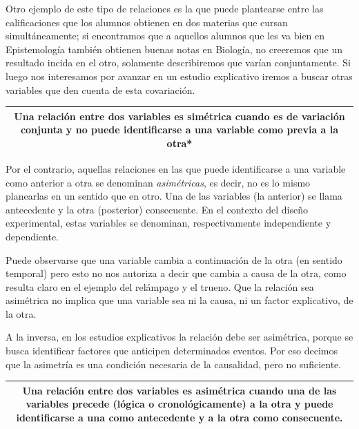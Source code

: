 \documentclass[]{book}
\begin{document}
Otro ejemplo de este tipo de relaciones es la que puede plantearse entre las calificaciones que los alumnos obtienen en dos materias que cursan simultáneamente; si encontramos que a aquellos alumnos que les va bien en Epistemología también obtienen buenas notas en Biología, no creeremos que un resultado incida en el otro, solamente describiremos que varían conjuntamente. Si luego nos interesamos por avanzar en un estudio explicativo iremos a buscar otras variables que den cuenta de esta covariación.

\begin{longtable}[]{@{}c@{}}
\toprule
\endhead
\begin{minipage}[t]{0.97\columnwidth}\centering
Una relación entre dos variables es \textbf{simétrica} cuando es de variación conjunta y no puede identificarse a una variable como previa a la otra*\strut
\end{minipage}\tabularnewline
\bottomrule
\end{longtable}

Por el contrario, aquellas relaciones en las que puede identificarse a una variable como anterior a otra se denominan \emph{asimétricas}, es
decir, no es lo mismo planearlas en un sentido que en otro. Una de las
variables (la anterior) se llama antecedente y la otra (posterior)
consecuente. En el contexto del diseño experimental, estas variables se denominan, respectivamente independiente y dependiente.

Puede observarse que una variable cambia a continuación de la otra (en
sentido temporal) pero esto no nos autoriza a decir que cambia a causa
de la otra, como resulta claro en el ejemplo del relámpago y el trueno.
Que la relación sea asimétrica no implica que una variable sea ni la
causa, ni un factor explicativo, de la otra.

A la inversa, en los estudios explicativos la relación debe ser
asimétrica, porque se busca identificar factores que anticipen
determinados eventos. Por eso decimos que la asimetría es una condición
necesaria de la causalidad, pero no suficiente.

\begin{longtable}[]{@{}c@{}}
\toprule
\endhead
\begin{minipage}[t]{0.97\columnwidth}\centering
Una relación entre dos variables es \textbf{asimétrica} cuando una de las variables precede (lógica o cronológicamente) a la otra y puede identificarse a una como antecedente y a la otra como consecuente.\strut
\end{minipage}\tabularnewline
\bottomrule
\end{longtable}
\end{document}
